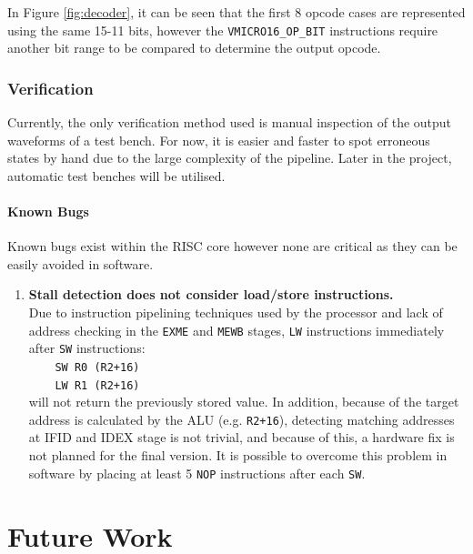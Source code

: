 \documentclass[11pt,a4paper]{report}
\begin{document}
{In Figure \ref{fig:decoder}, it can be seen that the first 8 opcode cases are represented using the same 15-11 bits, however the \verb|VMICRO16_OP_BIT| instructions require another bit range to be compared to determine the output opcode.

\subsection{Verification}
Currently, the only verification method used is manual inspection of the output waveforms of a test bench. For now, it is easier and faster to spot erroneous states by hand due to the large complexity of the pipeline. Later in the project, automatic test benches will be utilised. 

\subsubsection{Known Bugs}
Known bugs exist within the RISC core however none are critical as they can be easily avoided in software.

\begin{enumerate}[leftmargin=3\parindent, label=\bfseries BUG\arabic*, style=nextline]
\item{\textbf{Stall detection does not consider load/store instructions.}\\
Due to instruction pipelining techniques used by the processor and lack of address checking in the \verb|EXME| and \verb|MEWB| stages, \verb|LW| instructions immediately after \verb|SW| instructions:\\ \verb|    SW R0 (R2+16)|\\ \verb|    LW R1 (R2+16)|\\
will not return the previously stored value. In addition, because of the target address is calculated by the ALU (e.g. \verb|R2+16|), detecting matching addresses at IFID and IDEX stage is not trivial, and because of this, a hardware fix is not planned for the final version. It is possible to overcome this problem in software by placing at least 5 \verb|NOP| instructions after each \verb|SW|. 
}\label{bug:swlw}
\end{enumerate}


\chapter{Future Work}

{%
\startcontents[chapters]
}

}
\end{document}
